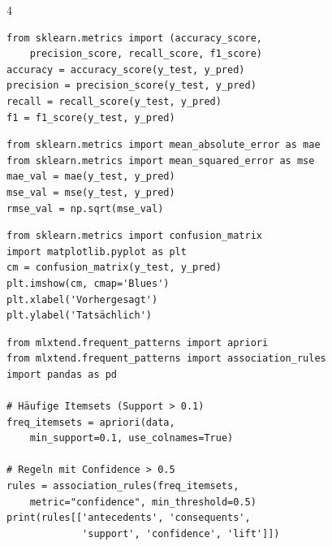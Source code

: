 \begin{landscape}
\begin{multicols*}{4}

		\begin{cheatSheetBox}[title=Klassifikations-Metriken]
			\begin{lstlisting}
from sklearn.metrics import (accuracy_score, 
    precision_score, recall_score, f1_score)
accuracy = accuracy_score(y_test, y_pred)
precision = precision_score(y_test, y_pred)
recall = recall_score(y_test, y_pred)
f1 = f1_score(y_test, y_pred)
			\end{lstlisting}
		\end{cheatSheetBox}

		\begin{cheatSheetBox}[title=Regression-Metriken]
			\begin{lstlisting}
from sklearn.metrics import mean_absolute_error as mae
from sklearn.metrics import mean_squared_error as mse
mae_val = mae(y_test, y_pred)
mse_val = mse(y_test, y_pred)
rmse_val = np.sqrt(mse_val)
			\end{lstlisting}
		\end{cheatSheetBox}

		\begin{cheatSheetBox}[title=Konfusionsmatrix visualisieren]
			\begin{lstlisting}
from sklearn.metrics import confusion_matrix
import matplotlib.pyplot as plt
cm = confusion_matrix(y_test, y_pred)
plt.imshow(cm, cmap='Blues')
plt.xlabel('Vorhergesagt')
plt.ylabel('Tatsächlich')
			\end{lstlisting}
		\end{cheatSheetBox}

		\columnbreak


		\begin{cheatSheetBox}[title=Apriori mit MLxtend]
			\begin{lstlisting}
from mlxtend.frequent_patterns import apriori
from mlxtend.frequent_patterns import association_rules
import pandas as pd

# Häufige Itemsets (Support > 0.1)
freq_itemsets = apriori(data, 
    min_support=0.1, use_colnames=True)

# Regeln mit Confidence > 0.5
rules = association_rules(freq_itemsets, 
    metric="confidence", min_threshold=0.5)
print(rules[['antecedents', 'consequents', 
             'support', 'confidence', 'lift']])
			\end{lstlisting}
		\end{cheatSheetBox}


\end{multicols*}
\end{landscape}
